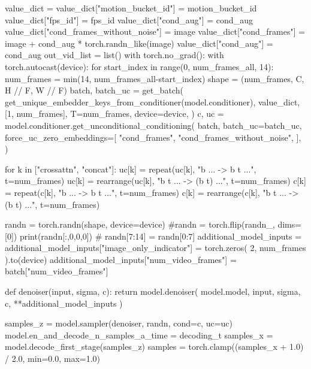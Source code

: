         value_dict = {}
        value_dict["motion_bucket_id"] = motion_bucket_id
        value_dict["fps_id"] = fps_id
        value_dict["cond_aug"] = cond_aug
        value_dict["cond_frames_without_noise"] = image
        value_dict["cond_frames"] = image + cond_aug * torch.randn_like(image)
        value_dict["cond_aug"] = cond_aug
        out_vid_list = list()
        with torch.no_grad():
            with torch.autocast(device):
                for start_index in range(0, num_frames_all, 14):
                    num_frames = min(14, num_frames_all-start_index)
                    shape = (num_frames, C, H // F, W // F)
                    batch, batch_uc = get_batch(
                        get_unique_embedder_keys_from_conditioner(model.conditioner),
                        value_dict,
                        [1, num_frames],
                        T=num_frames,
                        device=device,
                    )
                    c, uc = model.conditioner.get_unconditional_conditioning(
                        batch,
                        batch_uc=batch_uc,
                        force_uc_zero_embeddings=[
                            "cond_frames",
                            "cond_frames_without_noise",
                        ],
                    )

                    for k in ["crossattn", "concat"]:
                        uc[k] = repeat(uc[k], "b ... -> b t ...", t=num_frames)
                        uc[k] = rearrange(uc[k], "b t ... -> (b t) ...", t=num_frames)
                        c[k] = repeat(c[k], "b ... -> b t ...", t=num_frames)
                        c[k] = rearrange(c[k], "b t ... -> (b t) ...", t=num_frames)

                    randn = torch.randn(shape, device=device)
                    #randn = torch.flip(randn_, dims=[0])
                    print(randn[:,0,0,0])
                    # randn[7:14] = randn[0:7]
                    additional_model_inputs = {}
                    additional_model_inputs["image_only_indicator"] = torch.zeros(
                        2, num_frames
                    ).to(device)
                    additional_model_inputs["num_video_frames"] = batch["num_video_frames"]

                    def denoiser(input, sigma, c):
                        return model.denoiser(
                            model.model, input, sigma, c, **additional_model_inputs
                        )

                    samples_z = model.sampler(denoiser, randn, cond=c, uc=uc)
                    model.en_and_decode_n_samples_a_time = decoding_t
                    samples_x = model.decode_first_stage(samples_z)
                    samples = torch.clamp((samples_x + 1.0) / 2.0, min=0.0, max=1.0)


